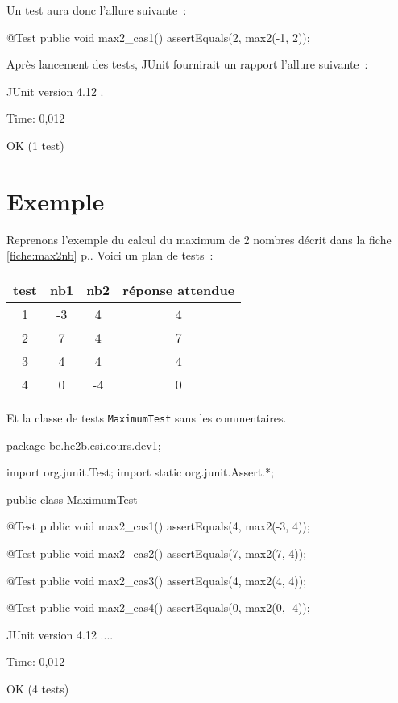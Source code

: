 Un test aura donc l'allure suivante~:

\begin{java}
@Test
public void max2_cas1(){
	assertEquals(2, max2(-1, 2));
}
\end{java}

Après lancement des tests, JUnit fournirait un rapport l'allure suivante~:

\begin{term}
JUnit version 4.12
.

Time: 0,012

OK (1 test)
\end{term}

\section{Exemple}

Reprenons l'exemple du calcul du maximum de 2 nombres décrit dans la fiche
\ref{fiche:max2nb} p.\pageref{fiche:max2nb}. Voici un plan de tests~:

\begin{center}
\begin{tabular}{|c|cc|c|}
	\hline
	\rowcolor{black!40}
	test \no & nb1 & nb2 & réponse attendue  \\
	\hline 
	1 & -3    & 4   & 4	\\\hline
	2 & 7     & 4   & 7 \\\hline
	3 & 4     & 4   & 4 \\\hline
	4 & 0     & -4  & 0 \\\hline
\end{tabular}
\end{center}		

Et la classe de tests \texttt{MaximumTest} sans les commentaires.

\begin{java}
package be.he2b.esi.cours.dev1;

import org.junit.Test;
import static org.junit.Assert.*;

public class MaximumTest {
    
    
	@Test
	public void max2_cas1(){
		assertEquals(4, max2(-3, 4));
	}

	@Test
	public void max2_cas2(){
		assertEquals(7, max2(7, 4));
	}

	@Test
	public void max2_cas3(){
		assertEquals(4, max2(4, 4));
	}

	@Test
	public void max2_cas4(){
		assertEquals(0, max2(0, -4));
	}
}
\end{java}


\begin{term}
JUnit version 4.12
....

Time: 0,012

OK (4 tests)
\end{term}






